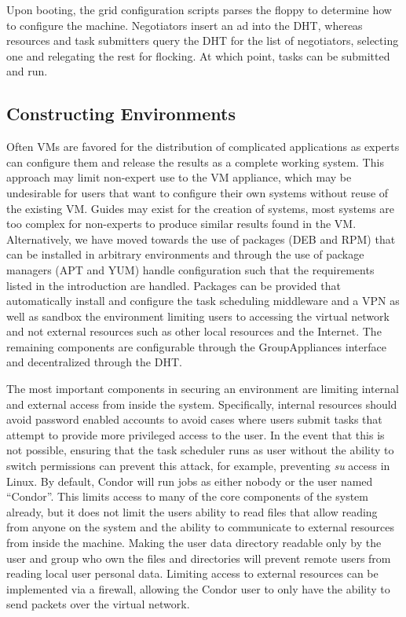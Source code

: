 \documentclass{sig-alternate}
\begin{document}
Upon booting, the grid configuration scripts parses the floppy to determine how
to configure the machine.  Negotiators insert an ad into the DHT, whereas
resources and task submitters query the DHT for the list of negotiators,
selecting one and relegating the rest for flocking.  At which point, tasks
can be submitted and run.

\subsection{Constructing Environments}
Often VMs are favored for the distribution of complicated applications as
experts can configure them and release the results as a complete working system.
This approach may limit non-expert use to the VM appliance, which may be
undesirable for users that want to configure their own systems without reuse
of the existing VM.  Guides may exist for the creation of systems, most
systems are too complex for non-experts to produce similar results found in the
VM.  Alternatively, we have moved towards the use of packages (DEB and RPM)
that can be installed in arbitrary environments and through the use of package
managers (APT and YUM) handle configuration such that the requirements listed
in the introduction are handled.  Packages can be provided that automatically
install and configure the task scheduling middleware and a VPN as well as
sandbox the environment limiting users to accessing the virtual network and not
external resources such as other local resources and the Internet.  The
remaining components are configurable through the GroupAppliances interface and
decentralized through the DHT.

The most important components in securing an environment are limiting internal
and external access from inside the system.  Specifically, internal resources
should avoid password enabled accounts to avoid cases where users submit tasks
that attempt to provide more privileged access to the user.  In the event that
this is not possible, ensuring that the task scheduler runs as user without
the ability to switch permissions can prevent this attack, for example,
preventing \textit{su} access in Linux.  By default, Condor will run jobs as
either nobody or the user named ``Condor''.  This limits access to many of the
core components of the system already, but it does not limit the users ability
to read files that allow reading from anyone on the system and the ability to
communicate to external resources from inside the machine.  Making the user
data directory readable only by the user and group who own the files and
directories will prevent remote users from reading local user personal data.
Limiting access to external resources can be implemented via a firewall,
allowing the Condor user to only have the ability to send packets over the
virtual network.
\end{document}
